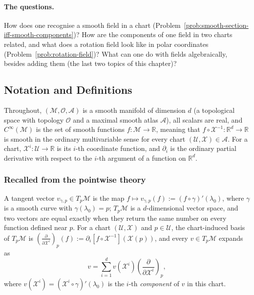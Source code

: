 \documentclass[11pt]{article}
\newcommand{\TpM}{T_p\mathcal M}
\newcommand{\Cinf}{C^\infty(\mathcal M)}
\begin{document}
\paragraph{The questions.}
How does one recognise a smooth field in a chart (Problem~\ref{prob:smooth-section-iff-smooth-components})? How are the components of one field in two charts related, and what does a rotation field look like in polar coordinates (Problem~\ref{prob:rotation-field})? What can one do with fields algebraically, besides adding them (the last two topics of this chapter)?

\subsection*{Notation and Definitions}

\noindent Throughout, $(\mathcal M,\mathcal O,\mathcal A)$ is a smooth manifold of dimension $d$ (a topological space with topology $\mathcal O$ and a maximal smooth atlas $\mathcal A$), all scalars are real, and $\Cinf$ is the set of smooth functions $f:\mathcal M\to\mathbb R$, meaning that $f\circ\mathcal X^{-1}:\mathbb R^d\to\mathbb R$ is smooth in the ordinary multivariable sense for every chart $(\mathcal U,\mathcal X)\in\mathcal A$. For a chart, $\mathcal X^i:\mathcal U\to\mathbb R$ is its $i$-th coordinate function, and $\partial_i$ is the ordinary partial derivative with respect to the $i$-th argument of a function on $\mathbb R^d$.

\subsubsection*{Recalled from the pointwise theory}
A tangent vector $v_{\gamma,p}\in\TpM$ is the map $f\mapsto v_{\gamma,p}(f):=(f\circ\gamma)'(\lambda_0)$, where $\gamma$ is a smooth curve with $\gamma(\lambda_0)=p$; $\TpM$ is a $d$-dimensional vector space, and two vectors are equal exactly when they return the same number on every function defined near $p$. For a chart $(\mathcal U,\mathcal X)$ and $p\in\mathcal U$, the chart-induced basis of $\TpM$ is $\left(\frac{\partial}{\partial\mathcal X^i}\right)_p(f):=\partial_i[f\circ\mathcal X^{-1}](\mathcal X(p))$, and every $v\in\TpM$ expands as
\begin{equation}
v=\sum_{i=1}^d v(\mathcal X^i)\left(\frac{\partial}{\partial\mathcal X^i}\right)_p,
\tag{5.1}\label{eq:5-vec-expansion}
\end{equation}
where $v(\mathcal X^i)=(\mathcal X^i\circ\gamma)'(\lambda_0)$ is the $i$-th \emph{component} of $v$ in this chart.
\end{document}
